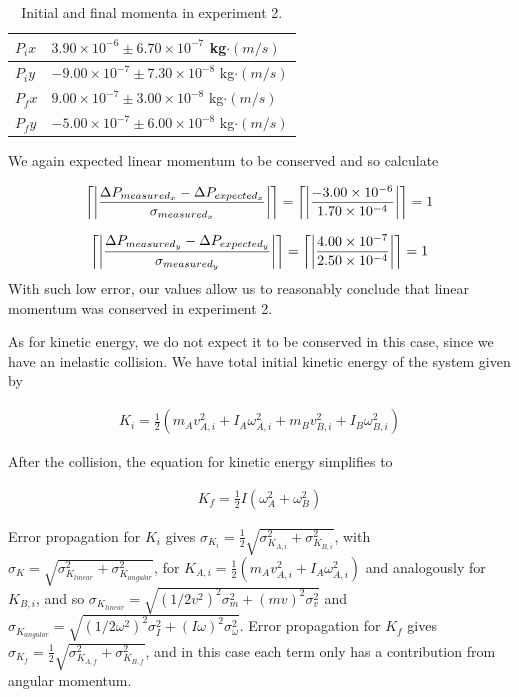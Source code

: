 \documentclass[11pt]{article}
\DeclarePairedDelimiter{\ceil}{\lceil}{\rceil}
\begin{document}
\begin{table}[]
\centering
\caption{Initial and final momenta in experiment 2.}
\label{mom2}
\begin{tabular}{|l|l|}
\hline
$P_ix$ & $3.90\times10^{-6}\pm6.70\times10^{-7}$ kg$\cdot(m/s)$   \\ \hline
$P_iy$ & $-9.00\times10^{-7}\pm 7.30\times10^{-8}$ kg$\cdot(m/s)$ \\ \hline
$P_fx$ & $9.00\times10^{-7}\pm 3.00\times 10^{-8}$  kg$\cdot(m/s)$ \\ \hline
$P_fy$ & $-5.00\times10^{-7} \pm 6.00\times 10^{-8}$ kg$\cdot(m/s)$\\ \hline
\end{tabular}
\end{table}

We again expected linear momentum to be conserved and so calculate

\begin{align}
\ceil*{\left\vert\frac{\Delta P_{measured_x}-\Delta P_{expected_x}}{\sigma_{measured_x}}\right\vert} = \ceil*{\left\vert\frac{-3.00\times10^{-6}}{1.70\times 10^{-4}}\right\vert} = 1
\label{errPx2}
\end{align}

\begin{align}
\ceil*{\left\vert\frac{\Delta P_{measured_y}-\Delta P_{expected_y}}{\sigma_{measured_y}}\right\vert} = \ceil*{\left\vert\frac{4.00\times10^{-7}}{2.50\times10^{-4}}\right\vert} = 1
\label{errPy2}
\end{align}
With such low error, our values allow us to reasonably conclude that linear momentum was conserved in experiment 2.

As for kinetic energy, we do not expect it to be conserved in this case, since we have an inelastic collision. We have total initial kinetic energy of the system given by 

\begin{align}
K_i = \frac{1}{2}(m_A v_{A,i}^2 + I_A \omega_{A,i}^2 + m_B v_{B,i}^2 +I_B \omega_{B,i}^2)
\end{align}

After the collision, the equation for kinetic energy simplifies to 

\begin{align}
K_f =\frac{1}{2}I(\omega_A^2+\omega_B^2)
\end{align}

Error propagation for $K_i$ gives $\sigma_{K_i} = \frac{1}{2}\sqrt{\sigma_{K_{A,i}}^2+\sigma_{K_{B,i}}^2}$, with $\sigma_K = \sqrt{\sigma_{K_{linear}}^2+\sigma_{K_{angular}}^2}$, for $K_{A,i}=\frac{1}{2}(m_A v_{A,i}^2+I_A \omega_{A,i}^2)$ and analogously for $K_{B,i}$, and so $\sigma_{K_{linear}}=\sqrt{(1/2v^2)^2\sigma_m^2+(mv)^2\sigma_v^2}$ and $\sigma_{K_{angular}}=\sqrt{(1/2\omega^2)^2\sigma_I^2+(I\omega)^2\sigma_{\omega}^2}$. Error propagation for $K_f$ gives $\sigma_{K_f}=\frac{1}{2}\sqrt{\sigma_{K_{A,f}}^2+\sigma_{K_{B,f}}^2}$, and in this case each term only has a contribution from angular momentum.
\end{document}
